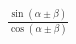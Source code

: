 \documentclass[preview]{standalone}
\begin{document}
\begin{align*}
\frac{\sin(\alpha\pm\beta)}{\cos(\alpha\pm\beta)}
\end{align*}
\end{document}
